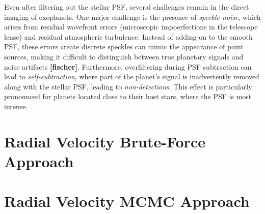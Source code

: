 \documentclass[preprint,longauthor]{aastex631}
\numberwithin{equation}{section}
\begin{document}
Even after filtering out the stellar PSF, several challenges remain in the direct imaging of exoplanets. One major challenge is the presence of \textit{speckle noise}, which arises from residual wavefront errors (microscopic impoerfections in the telescope lense) and residual atmospheric turbulence. Instead of adding on to the smooth PSF, these errors create discrete speckles can mimic the appearance of point sources, making it difficult to distinguish between true planetary signals and noise artifacts \textbf{[fischer]}. Furthermore, overfiltering during PSF subtraction can lead to \textit{self-subtraction}, where part of the planet's signal is inadvertently removed along with the stellar PSF, leading to \textit{non-detections}. This effect is particularly pronounced for planets located close to their host stars, where the PSF is most intense.

\appendix
\section[Appendix A]{Radial Velocity Brute-Force Approach}
\label{appx:A}



\section[Appendix B]{Radial Velocity MCMC Approach}
\label{appx:B}




\end{document}
